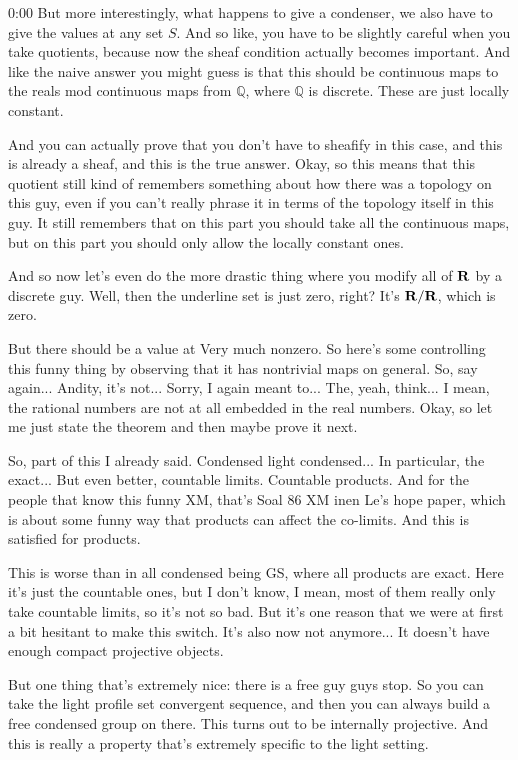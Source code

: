 \begin{unfinished}{0:00}
But more interestingly, what happens to give a condenser, we also have to give the values at any set $S$. And so like, you have to be slightly careful when you take quotients, because now the sheaf condition actually becomes important. And like the naive answer you might guess is that this should be continuous maps to the reals mod continuous maps from $\mathbb{Q}$, where $\mathbb{Q}$ is discrete. These are just locally constant.

And you can actually prove that you don't have to sheafify in this case, and this is already a sheaf, and this is the true answer. Okay, so this means that this quotient still kind of remembers something about how there was a topology on this guy, even if you can't really phrase it in terms of the topology itself in this guy. It still remembers that on this part you should take all the continuous maps, but on this part you should only allow the locally constant ones.

And so now let's even do the more drastic thing where you modify all of $\mathbf R$ by a discrete guy. Well, then the underline set is just zero, right? It's $\mathbf R/\mathbf R$, which is zero.

But there should be a value at 
Very much nonzero. So here's some controlling this funny thing by observing that it has nontrivial maps on general. So, say again... Andity, it's not... Sorry, I again meant to... The, yeah, think... I mean, the rational numbers are not at all embedded in the real numbers. Okay, so let me just state the theorem and then maybe prove it next.

So, part of this I already said. Condensed light condensed... In particular, the exact... But even better, countable limits. Countable products. And for the people that know this funny XM, that's Soal 86 XM inen Le's hope paper, which is about some funny way that products can affect the co-limits. And this is satisfied for products.

This is worse than in all condensed being GS, where all products are exact. Here it's just the countable ones, but I don't know, I mean, most of them really only take countable limits, so it's not so bad. But it's one reason that we were at first a bit hesitant to make this switch. It's also now not anymore... It doesn't have enough compact projective objects.

But one thing that's extremely nice: there is a free guy guys stop. So you can take the light profile set convergent sequence, and then you can always build a free condensed group on there. This turns out to be internally projective. And this is really a property that's extremely specific to the light setting.


\end{unfinished}
